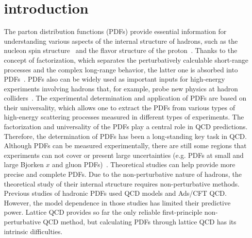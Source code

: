 \documentclass[english,preprint,aps,prd,showpacs,superscriptaddress,nofootinbib,tightenlines]{revtex4}
\begin{document}


\maketitle

\section{introduction}

The parton distribution functions (PDFs) provide essential information for understanding various aspects of  the internal structure of hadrons, such
as the nucleon spin structure~\cite{Ji:1996ek,Ji:2012sj,Yang:2016plb} and the
flavor structure of the proton~\cite{Peng:2014uea,Chang:2014jba}. Thanks to the concept of factorization, which separates the perturbatively calculable short-range processes and the complex long-range behavior, the latter one is absorbed into PDFs~\cite{Collins:1989gx}. PDFs also can be widely used as important inputs for high-energy experiments involving hadrons that, for example, probe new physics at hadron colliders~\cite{Martin:2009iq,Lai:2010vv}. The experimental determination and application of PDFs are based on their universality, which allows one to extract the PDFs from various types of high-energy scattering processes  measured in different types of experiments. The factorization and universality of the PDFs play a central role in QCD predictions. Therefore, the determination of PDFs has been a long-standing key task in QCD. Although PDFs can be measured experimentally, there are still some regions that experiments can not  cover or present large uncertainties (e.g. PDFs at small and large Bjorken $x$ and gluon PDFs)~\cite{Dulat:2015mca,Gauld:2016kpd}. Theoretical studies can help  provide more precise and complete PDFs. Due to the  non-perturbative nature of hadrons, the theoretical study of their internal structure requires non-perturbative methods. Previous studies of hadronic PDFs used QCD models and Ads/CFT QCD. However, the model dependence in those studies has limited their predictive power. Lattice QCD provides so far the only reliable first-principle non-perturbative QCD method, but calculating PDFs through lattice QCD has its intrinsic difficulties.
\end{document}
